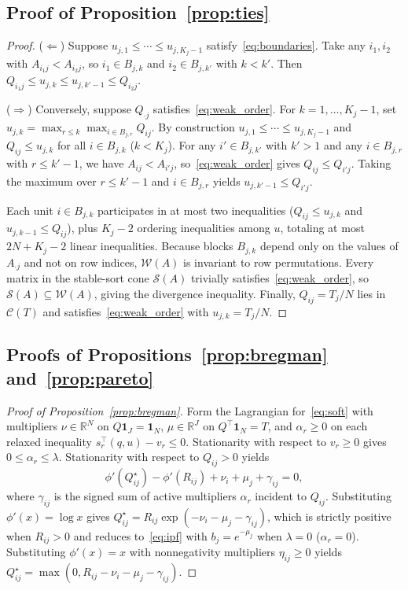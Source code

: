 \documentclass[11pt]{article}
\begin{document}
\subsection{Proof of \texorpdfstring{Proposition~\ref{prop:ties}}{Proposition 2}}

\begin{proof}
($\Leftarrow$) Suppose $u_{j,1} \le \cdots \le u_{j,K_j-1}$ satisfy~\eqref{eq:boundaries}. Take any $i_1, i_2$ with $A_{i_1 j} < A_{i_2 j}$, so $i_1 \in B_{j,k}$ and $i_2 \in B_{j,k'}$ with $k < k'$. Then $Q_{i_1 j} \le u_{j,k} \le u_{j,k'-1} \le Q_{i_2 j}$.

($\Rightarrow$) Conversely, suppose $Q_{\cdot j}$ satisfies~\eqref{eq:weak_order}. For $k = 1,\dots,K_j - 1$, set $u_{j,k} = \max_{r \le k} \max_{i \in B_{j,r}} Q_{ij}$. By construction $u_{j,1} \le \cdots \le u_{j,K_j-1}$ and $Q_{ij} \le u_{j,k}$ for all $i \in B_{j,k}$ ($k < K_j$). For any $i' \in B_{j,k'}$ with $k' > 1$ and any $i \in B_{j,r}$ with $r \le k' - 1$, we have $A_{ij} < A_{i'j}$, so~\eqref{eq:weak_order} gives $Q_{ij} \le Q_{i'j}$. Taking the maximum over $r \le k'-1$ and $i \in B_{j,r}$ yields $u_{j,k'-1} \le Q_{i'j}$.

Each unit $i \in B_{j,k}$ participates in at most two inequalities ($Q_{ij} \le u_{j,k}$ and $u_{j,k-1} \le Q_{ij}$), plus $K_j - 2$ ordering inequalities among $u$, totaling at most $2N + K_j - 2$ linear inequalities. Because blocks $B_{j,k}$ depend only on the values of $A_{\cdot j}$ and not on row indices, $\mathcal{W}(A)$ is invariant to row permutations. Every matrix in the stable-sort cone $\mathcal{S}(A)$ trivially satisfies~\eqref{eq:weak_order}, so $\mathcal{S}(A) \subseteq \mathcal{W}(A)$, giving the divergence inequality. Finally, $Q_{ij} = T_j/N$ lies in $\mathcal{C}(T)$ and satisfies~\eqref{eq:weak_order} with $u_{j,k} = T_j/N$.
\end{proof}

\subsection{Proofs of \texorpdfstring{Propositions~\ref{prop:bregman} and~\ref{prop:pareto}}{Propositions 3 and 4}}

\begin{proof}[Proof of Proposition~\ref{prop:bregman}]
Form the Lagrangian for~\eqref{eq:soft} with multipliers $\nu \in \mathbb{R}^N$ on $Q\mathbf{1}_J = \mathbf{1}_N$, $\mu \in \mathbb{R}^J$ on $Q^\top\mathbf{1}_N = T$, and $\alpha_r \ge 0$ on each relaxed inequality $s_r^\top (q, u) - v_r \le 0$. Stationarity with respect to $v_r \ge 0$ gives $0 \le \alpha_r \le \lambda$. Stationarity with respect to $Q_{ij} > 0$ yields
\[
\phi'(Q^\star_{ij}) - \phi'(R_{ij}) + \nu_i + \mu_j + \gamma_{ij} = 0,
\]
where $\gamma_{ij}$ is the signed sum of active multipliers $\alpha_r$ incident to $Q_{ij}$. Substituting $\phi'(x) = \log x$ gives $Q^\star_{ij} = R_{ij}\exp(-\nu_i - \mu_j - \gamma_{ij})$, which is strictly positive when $R_{ij} > 0$ and reduces to~\eqref{eq:ipf} with $b_j = e^{-\mu_j}$ when $\lambda = 0$ ($\alpha_r = 0$). Substituting $\phi'(x) = x$ with nonnegativity multipliers $\eta_{ij} \ge 0$ yields $Q^\star_{ij} = \max(0, R_{ij} - \nu_i - \mu_j - \gamma_{ij})$.
\end{proof}
\end{document}
